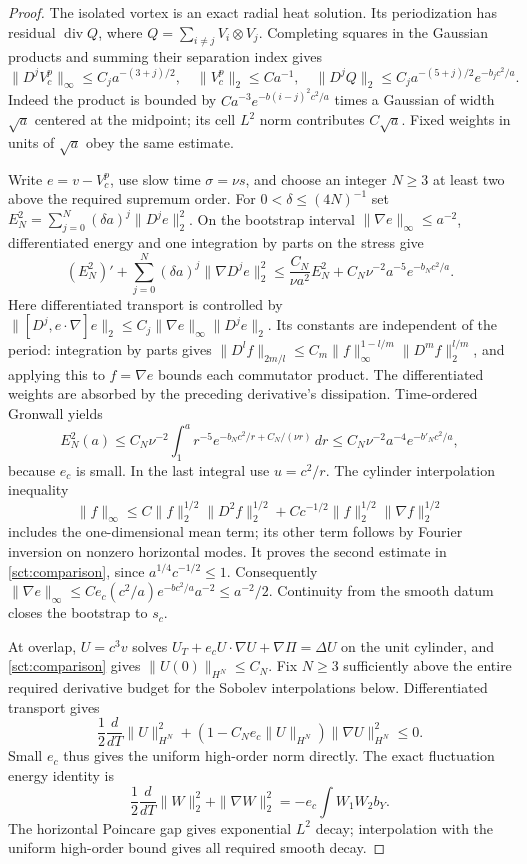 \begin{proof}
The isolated vortex is an exact radial heat solution. Its periodization
has residual $\operatorname{div}Q$, where
$Q=\sum_{i\ne j}V_i\otimes V_j$. Completing squares in the Gaussian
products and summing their separation index gives
\[
 \|D^jV_c^p\|_\infty\leq C_ja^{-(3+j)/2},\quad
 \|V_c^p\|_2\leq Ca^{-1},\quad
 \|D^jQ\|_2\leq C_ja^{-(5+j)/2}e^{-b_jc^2/a}.
\]
Indeed the product is bounded by $Ca^{-3}e^{-b(i-j)^2c^2/a}$
times a Gaussian of width $\sqrt a$ centered at the midpoint; its
cell $L^2$ norm contributes $C\sqrt a$. Fixed weights in units of
$\sqrt a$ obey the same estimate.

Write $e=v-V_c^p$, use slow time $\sigma=\nu s$, and choose an integer
$N\geq3$ at least two above the required supremum order. For
$0<\delta\leq(4N)^{-1}$ set
$E_N^2=\sum_{j=0}^N(\delta a)^j\|D^je\|_2^2$.
On the bootstrap interval $\|\nabla e\|_\infty\leq a^{-2}$,
differentiated energy and one integration by parts on the stress give
\[
 (E_N^2)' +\sum_{j=0}^N(\delta a)^j\|\nabla D^je\|_2^2
 \leq \frac{C_N}{\nu a^2}E_N^2+
                 C_N\nu^{-2}a^{-5}e^{-b_Nc^2/a}.
\]
Here differentiated transport is controlled by
$\|[D^j,e\cdot\nabla]e\|_2
 \leq C_j\|\nabla e\|_\infty\|D^je\|_2$.
Its constants are independent of the period: integration by parts gives
$\|D^lf\|_{2m/l}\leq C_m\|f\|_\infty^{1-l/m}
\|D^mf\|_2^{l/m}$, and applying this to $f=\nabla e$ bounds
each commutator product. The differentiated weights are absorbed by
the preceding derivative's dissipation. Time-ordered Gronwall yields
\[
 E_N^2(a)\leq C_N\nu^{-2}\int_1^a
 r^{-5}e^{-b_Nc^2/r+C_N/(\nu r)}\,dr
 \leq C_N\nu^{-2}a^{-4}e^{-b'_Nc^2/a},
\]
because $e_c$ is small. In the last integral use $u=c^2/r$.
The cylinder interpolation inequality
\[
 \|f\|_\infty\leq
 C\|f\|_2^{1/2}\|D^2f\|_2^{1/2}
 +Cc^{-1/2}\|f\|_2^{1/2}\|\nabla f\|_2^{1/2}
\]
includes the one-dimensional mean term; its other term follows by
Fourier inversion on nonzero horizontal modes. It proves the second
estimate in \eqref{sct:comparison}, since $a^{1/4}c^{-1/2}\leq1$.
Consequently $\|\nabla e\|_\infty\leq
 Ce_c(c^2/a)e^{-bc^2/a}a^{-2}\leq a^{-2}/2$.
Continuity from the smooth datum closes the bootstrap to $s_c$.

At overlap, $U=c^3v$ solves
$U_T+e_cU\cdot\nabla U+\nabla\Pi=\Delta U$ on the unit cylinder,
and \eqref{sct:comparison} gives $\|U(0)\|_{H^N}\leq C_N$.
Fix $N\geq3$ sufficiently above the entire required derivative budget
for the Sobolev interpolations below. Differentiated
transport gives
\[
 \frac12\frac d{dT}\|U\|_{H^N}^2+
 (1-C_Ne_c\|U\|_{H^N})\|\nabla U\|_{H^N}^2\leq0.
\]
Small $e_c$ thus gives the uniform high-order norm directly. The exact
fluctuation energy identity is
\[
 \frac12\frac d{dT}\|W\|_2^2+\|\nabla W\|_2^2
       =-e_c\int W_1W_2 b_Y.
\]
The horizontal Poincare gap gives exponential $L^2$ decay; interpolation
with the uniform high-order bound gives all required smooth decay.


\end{proof}
